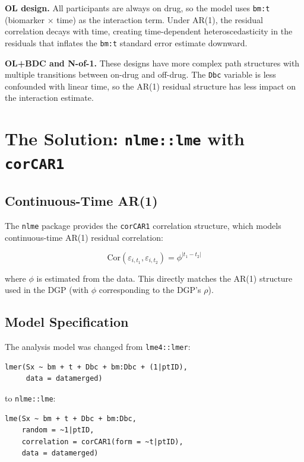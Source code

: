 \documentclass[11pt]{article}
\begin{document}
\textbf{OL design.} All participants are always on drug, so
the model uses \texttt{bm:t} (biomarker $\times$ time) as
the interaction term. Under AR(1), the residual correlation
decays with time, creating time-dependent heteroscedasticity
in the residuals that inflates the \texttt{bm:t} standard
error estimate downward.

\textbf{OL+BDC and N-of-1.} These designs have more complex
path structures with multiple transitions between on-drug and
off-drug. The \texttt{Dbc} variable is less confounded with
linear time, so the AR(1) residual structure has less impact
on the interaction estimate.

\section{The Solution: \texttt{nlme::lme} with \texttt{corCAR1}}

\subsection{Continuous-Time AR(1)}

The \texttt{nlme} package provides the \texttt{corCAR1}
correlation structure, which models continuous-time AR(1)
residual correlation:

\[
\text{Cor}(\varepsilon_{i,t_1}, \varepsilon_{i,t_2}) =
\phi^{|t_1 - t_2|}
\]

where $\phi$ is estimated from the data. This directly matches
the AR(1) structure used in the DGP (with $\phi$ corresponding
to the DGP's $\rho$).

\subsection{Model Specification}

The analysis model was changed from \texttt{lme4::lmer}:

\begin{verbatim}
lmer(Sx ~ bm + t + Dbc + bm:Dbc + (1|ptID),
     data = datamerged)
\end{verbatim}

to \texttt{nlme::lme}:

\begin{verbatim}
lme(Sx ~ bm + t + Dbc + bm:Dbc,
    random = ~1|ptID,
    correlation = corCAR1(form = ~t|ptID),
    data = datamerged)
\end{verbatim}
\end{document}
